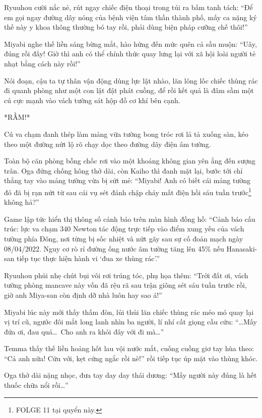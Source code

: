 \documentclass[../main.tex]{subfiles}
\begin{document}
Ryuuhou cười nắc nẻ, rút ngay chiếc điện thoại trong túi ra bấm tanh tách: ``Để em gọi ngay đường dây nóng của bệnh viện tâm thần thành phố, mấy ca nặng ký thế này y khoa thông thường bó tay rồi, phải dùng biện pháp cưỡng chế thôi!''

Miyabi nghe thế liền sáng bừng mắt, hào hứng đến mức quên cả sầu muộn: ``Uây, đúng rồi đấy! Giờ thì anh có thể chính thức quay lưng lại với xã hội loài người tẻ nhạt bằng cách này rồi!''

Nói đoạn, cậu ta tự thân vận động dùng lực lật nhào, lăn lông lốc chiếc thùng rác đi quanh phòng như một con lật đật phát cuồng, để rồi kết quả là đâm sầm một cú cực mạnh vào vách tường sát hộp đồ cơ khí bên cạnh.

*RẦM!*

Cú va chạm đanh thép làm mảng vữa tường bong tróc rơi lả tả xuống sàn, kéo theo một đường nứt lộ rõ chạy dọc theo đường dây điện âm tường.


Toàn bộ căn phòng bỗng chốc rơi vào một khoảng không gian yên ắng đến sượng trân. Oga đứng chống hông thở dài, còn Kaiho thì đanh mặt lại, bước tới chỉ thẳng tay vào mảng tường vừa bị sứt mẻ: ``Miyabi! Anh có biết cái mảng tường đó đã bị rạn nứt từ sau cái vụ sét đánh chập cháy mất điện hồi sáu tuần trước\footnote{{\humanist FOLGE 11} tại quyển này.} không hả?''

Game lập tức hiển thị thông số cảnh báo trên màn hình đồng hồ: ``Cảnh báo cấu trúc: lực va chạm 340 Newton tác động trực tiếp vào điểm xung yếu của vách tường phía Đông, nơi từng bị sốc nhiệt và nứt gãy sau sự cố đoản mạch ngày 08/04/2022. Nguy cơ rò rỉ đường ống nước âm tường tăng lên 45\% nếu Hanasaki-san tiếp tục thực hiện hành vi `đua xe thùng rác'.''

Ryuuhou phủi nhẹ chút bụi vôi rơi trúng tóc, phụ họa thêm: ``Trời đất ơi, vách tường phòng mancave này vốn đã rệu rã sau trận giông sét sáu tuần trước rồi, giờ anh Miya-san còn định dỡ nhà luôn hay sao á!''

Miyabi lúc này mới thấy thấm đòn, lủi thủi lăn chiếc thùng rác méo mó quay lại vị trí cũ, ngước đôi mắt long lanh nhìn ba người, lí nhí cất giọng cầu cứu: ``\dots Mấy đứa ơi, đau quá\dots\ Cho anh ra khỏi đây với đi mà\dots''

Temma thấy thế liền hoảng hốt lau vội nước mắt, cuống cuồng giơ tay hùa theo: ``Cả anh nữa! Cứu với, kẹt cứng ngắc rồi nè!'' rồi tiếp tục úp mặt vào thùng khóc.

Oga thở dài nặng nhọc, đưa tay day day thái dương: ``Mấy người này đúng là hết thuốc chữa nổi rồi\dots''
\end{document}
